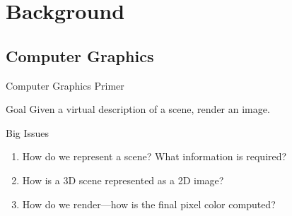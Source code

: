 \documentclass[10pt]{beamer}
\begin{document}
\section{Background}


\subsection{Computer Graphics}
\begin{frame}{Computer Graphics Primer}
  \begin{block}{Goal}
    Given a virtual description of a scene, render an image.
  \end{block}

  \begin{block}{Big Issues}
    \begin{enumerate}
      \item How do we represent a scene? What information is required?  %
      \item How is a 3D scene represented as a 2D image?  %
      \item How do we render---how is the final pixel color computed? %
    \end{enumerate}
  \end{block}
\end{frame}
\end{document}
